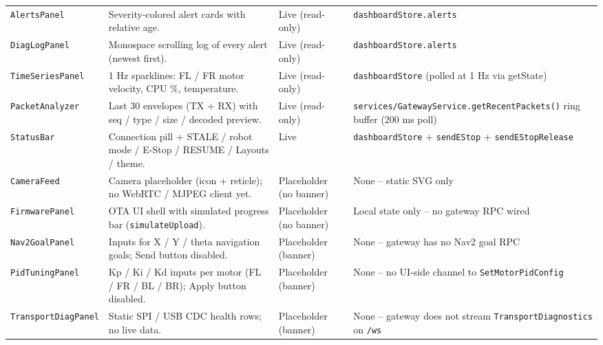 \begin{center}
\begin{tabular}{|p{2.6cm}|p{4.7cm}|p{2.6cm}|p{4.0cm}|}
\texttt{AlertsPanel}      & Severity-colored alert cards with relative age.                             & Live (read-only)            & \texttt{dashboardStore.alerts}                                              \\
\texttt{DiagLogPanel}     & Monospace scrolling log of every alert (newest first).                      & Live (read-only)            & \texttt{dashboardStore.alerts}                                              \\
\texttt{TimeSeriesPanel}  & 1 Hz sparklines: FL / FR motor velocity, CPU \%, temperature.               & Live (read-only)            & \texttt{dashboardStore} (polled at 1 Hz via getState)                       \\
\texttt{PacketAnalyzer}   & Last 30 envelopes (TX + RX) with seq / type / size / decoded preview.       & Live (read-only)            & \texttt{services/GatewayService.getRecentPackets()} ring buffer (200 ms poll) \\
\texttt{StatusBar}        & Connection pill + STALE / robot mode / E-Stop / RESUME / Layouts / theme.   & Live                        & \texttt{dashboardStore} + \texttt{sendEStop} + \texttt{sendEStopRelease}     \\
\texttt{CameraFeed}       & Camera placeholder (icon + reticle); no WebRTC / MJPEG client yet.          & Placeholder (no banner)     & None -- static SVG only                                                     \\
\texttt{FirmwarePanel}    & OTA UI shell with simulated progress bar (\texttt{simulateUpload}).         & Placeholder (no banner)     & Local state only -- no gateway RPC wired                                    \\
\texttt{Nav2GoalPanel}    & Inputs for X / Y / theta navigation goals; Send button disabled.            & Placeholder (banner)        & None -- gateway has no Nav2 goal RPC                                        \\
\texttt{PidTuningPanel}   & Kp / Ki / Kd inputs per motor (FL / FR / BL / BR); Apply button disabled.   & Placeholder (banner)        & None -- no UI-side channel to \texttt{SetMotorPidConfig}                    \\
\texttt{TransportDiagPanel}& Static SPI / USB CDC health rows; no live data.                            & Placeholder (banner)        & None -- gateway does not stream \texttt{TransportDiagnostics} on \texttt{/ws} \\
\hline
\end{tabular}
\end{center}

